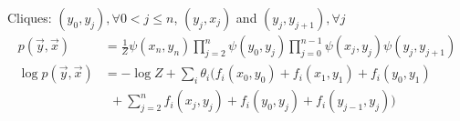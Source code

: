 Cliques: $(y_0, y_j), \forall 0 < j \leq n$, $(y_j, x_j)$ and $(y_j, y_{j+1}), \forall j$
\begin{align*}
    p(\vec{y}, \vec{x}) &= \frac{1}{Z}\psi(x_n, y_n)\prod_{j=2}^n\psi(y_0, y_j) \prod_{j=0}^{n-1} \psi(x_j, y_j)\psi(y_j, y_{j+1})\\
    \log p(\vec{y}, \vec{x}) 
        &= -\log Z + \sum_i \theta_i \biggr(f_i(x_0, y_0) + f_i(x_1, y_1) + f_i(y_0, y_1) \\ &~~+ \sum_{j=2}^n f_i(x_j, y_j) + f_i(y_0, y_j) + f_i(y_{j-1},y_j) \biggr)
\end{align*}